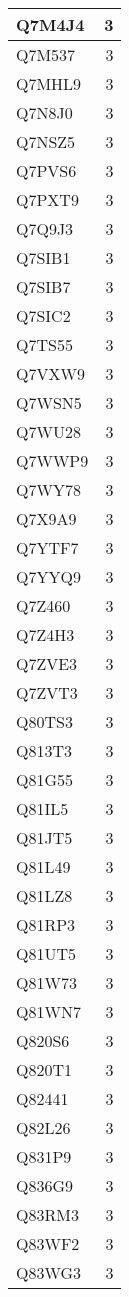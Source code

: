 \documentclass[
]{book}
\theoremstyle{definition}
\theoremstyle{definition}
\theoremstyle{definition}
\theoremstyle{definition}
\theoremstyle{remark}
\begin{document}
\begin{table}
\begin{tabular}{l|r}
\hline
Q7M4J4 & 3\\
\hline
Q7M537 & 3\\
\hline
Q7MHL9 & 3\\
\hline
Q7N8J0 & 3\\
\hline
Q7NSZ5 & 3\\
\hline
Q7PVS6 & 3\\
\hline
Q7PXT9 & 3\\
\hline
Q7Q9J3 & 3\\
\hline
Q7SIB1 & 3\\
\hline
Q7SIB7 & 3\\
\hline
Q7SIC2 & 3\\
\hline
Q7TS55 & 3\\
\hline
Q7VXW9 & 3\\
\hline
Q7WSN5 & 3\\
\hline
Q7WU28 & 3\\
\hline
Q7WWP9 & 3\\
\hline
Q7WY78 & 3\\
\hline
Q7X9A9 & 3\\
\hline
Q7YTF7 & 3\\
\hline
Q7YYQ9 & 3\\
\hline
Q7Z460 & 3\\
\hline
Q7Z4H3 & 3\\
\hline
Q7ZVE3 & 3\\
\hline
Q7ZVT3 & 3\\
\hline
Q80TS3 & 3\\
\hline
Q813T3 & 3\\
\hline
Q81G55 & 3\\
\hline
Q81IL5 & 3\\
\hline
Q81JT5 & 3\\
\hline
Q81L49 & 3\\
\hline
Q81LZ8 & 3\\
\hline
Q81RP3 & 3\\
\hline
Q81UT5 & 3\\
\hline
Q81W73 & 3\\
\hline
Q81WN7 & 3\\
\hline
Q820S6 & 3\\
\hline
Q820T1 & 3\\
\hline
Q82441 & 3\\
\hline
Q82L26 & 3\\
\hline
Q831P9 & 3\\
\hline
Q836G9 & 3\\
\hline
Q83RM3 & 3\\
\hline
Q83WF2 & 3\\
\hline
Q83WG3 & 3\\

\end{tabular}
\end{table}
\end{document}
